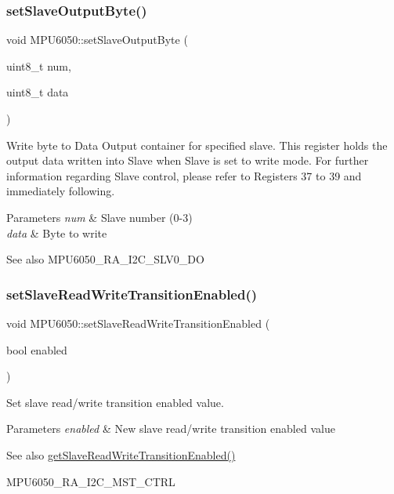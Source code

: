 \subsubsection{\texorpdfstring{setSlaveOutputByte()}{setSlaveOutputByte()}}
{\footnotesize\ttfamily void M\+P\+U6050\+::set\+Slave\+Output\+Byte (\begin{DoxyParamCaption}\item[{uint8\+\_\+t}]{num,  }\item[{uint8\+\_\+t}]{data }\end{DoxyParamCaption})}

Write byte to Data Output container for specified slave. This register holds the output data written into Slave when Slave is set to write mode. For further information regarding Slave control, please refer to Registers 37 to 39 and immediately following. 
\begin{DoxyParams}{Parameters}
{\em num} & Slave number (0-\/3) \\
\hline
{\em data} & Byte to write \\
\hline
\end{DoxyParams}
\begin{DoxySeeAlso}{See also}
M\+P\+U6050\+\_\+\+R\+A\+\_\+\+I2\+C\+\_\+\+S\+L\+V0\+\_\+\+DO 
\end{DoxySeeAlso}
\mbox{\label{class_m_p_u6050_a3413efbf2f4e8a27aa8768d9bc34d663}} 
\subsubsection{\texorpdfstring{setSlaveReadWriteTransitionEnabled()}{setSlaveReadWriteTransitionEnabled()}}
{\footnotesize\ttfamily void M\+P\+U6050\+::set\+Slave\+Read\+Write\+Transition\+Enabled (\begin{DoxyParamCaption}\item[{bool}]{enabled }\end{DoxyParamCaption})}

Set slave read/write transition enabled value. 
\begin{DoxyParams}{Parameters}
{\em enabled} & New slave read/write transition enabled value \\
\hline
\end{DoxyParams}
\begin{DoxySeeAlso}{See also}
\mbox{\hyperlink{class_m_p_u6050_a6b3c3aab80fcaa384303f9df2a59d7eb}{get\+Slave\+Read\+Write\+Transition\+Enabled()}} 

M\+P\+U6050\+\_\+\+R\+A\+\_\+\+I2\+C\+\_\+\+M\+S\+T\+\_\+\+C\+T\+RL 
\end{DoxySeeAlso}
\mbox{\label{class_m_p_u6050_a62851e982059a2462d52c210ad764a1c}} 
